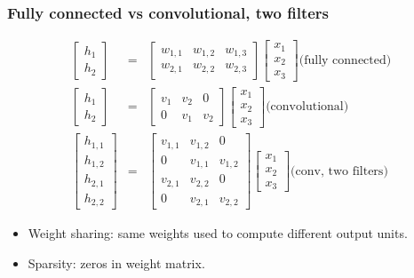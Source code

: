 \documentclass{beamer}
\begin{document}
\begin{frame}[fragile]
  \frametitle{Fully connected vs convolutional, two filters}
  \begin{eqnarray*}
  \begin{bmatrix}
    h_1 \\
    h_2 
  \end{bmatrix}
    &=&
  \begin{bmatrix}
    w_{1,1} & w_{1,2} & w_{1,3} \\
    w_{2,1} & w_{2,2} & w_{2,3}
  \end{bmatrix}
  \begin{bmatrix}
    x_1 \\
    x_2 \\
    x_3
  \end{bmatrix} \text{(fully connected)}
    \\
  \begin{bmatrix}
    h_1 \\
    h_2 
  \end{bmatrix}
    &=&
  \begin{bmatrix}
    v_{1} & v_{2} & 0 \\
    0 & v_{1} & v_{2}
  \end{bmatrix}
  \begin{bmatrix}
    x_1 \\
    x_2 \\
    x_3
  \end{bmatrix} \text{(convolutional)}\\
  \begin{bmatrix}
    h_{1,1} \\
    h_{1,2} \\
    h_{2,1} \\
    h_{2,2}
  \end{bmatrix}
    &=&
  \begin{bmatrix}
    v_{1,1} & v_{1,2} & 0 \\
    0 & v_{1,1} & v_{1,2} \\
    v_{2,1} & v_{2,2} & 0 \\
    0 & v_{2,1} & v_{2,2}
  \end{bmatrix}
  \begin{bmatrix}
    x_1 \\
    x_2 \\
    x_3
  \end{bmatrix} \text{(conv, two filters)}
  \end{eqnarray*}
  \begin{itemize}
  \item Weight sharing: same weights used to compute different
    output units. 
  \item Sparsity: zeros in weight matrix.
  \end{itemize}
\end{frame}
\end{document}
